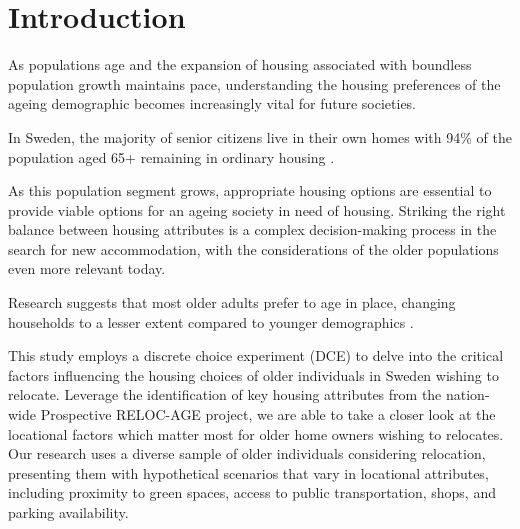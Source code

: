 \documentclass[3p,11pt ]{elsarticle}
\begin{document}
\begin{frontmatter}
\begin{abstract}
\end{abstract}
%
%
%
%
\end{frontmatter}


\newpage



\section{Introduction}

As populations age and the expansion of housing associated with boundless population growth maintains pace,
understanding the housing preferences of the ageing demographic becomes increasingly vital for future societies.

In Sweden, the majority of senior citizens live in their own homes with 94\% of the population aged 65+ remaining in ordinary housing \citep{jennbertDevelopmentsElderlyPolicy2009}.

As this population segment grows,
appropriate housing options are essential to provide viable options for an ageing society in need of housing.
Striking the right balance between housing attributes is a complex decision-making process in the search for new accommodation,
with the considerations of the older populations even more relevant today.

Research suggests that most older adults prefer to age in place,
changing households to a lesser extent compared to younger demographics  \citep{abramssonChangingLocationsCentral2015}.

This study employs a discrete choice experiment (DCE) to delve into the critical factors influencing the housing choices of older individuals in Sweden wishing to relocate.
Leverage the identification of key housing attributes from the nation-wide Prospective RELOC-AGE project,
we are able to take a closer look at the locational factors which matter most for older home owners wishing to relocates.
Our research uses a diverse sample of older individuals considering relocation, presenting them with hypothetical scenarios that vary in locational attributes, including proximity to green spaces, access to public transportation, shops, and parking availability.
\end{document}
